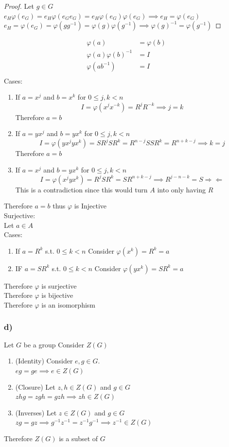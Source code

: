 \documentclass[12pt, letterpaper]{article}
\theoremstyle{definition}
\newcommand{\contr}{\Rightarrow \Leftarrow}
\begin{document}
\begin{proof}
    Let $g\in G$\\
    $e_H\varphi(e_G)=e_H\varphi(e_Ge_G)=e_H\varphi(e_G)\varphi(e_G) \implies e_H=\varphi(e_G)$\\
    $e_H=\varphi(e_G)=\varphi(gg^{-1})=\varphi(g)\varphi(g^{-1}) \implies \varphi(g)^{-1}=\varphi(g^{-1})$
\end{proof}
\begin{align*}
    \varphi(a) &= \varphi(b)\\
    \varphi(a)\varphi(b)^{-1} &= I\\
    \varphi(ab^{-1}) &= I\\
\end{align*}
Cases:
\begin{enumerate}
    \item If $a=x^j$ and $b=x^k$ for $0 \leq j,k < n$
    \[
    I=\varphi(x^jx^{-k})=R^jR^{-k} \implies j=k
    \]
    Therefore $a=b$
    \item If $a=yx^j$ and $b=yx^k$ for $0 \leq j,k < n$
    \[
    I=\varphi(yx^jyx^k)=SR^jSR^k=R^{n-j}SSR^k=R^{n+k-j} \implies k=j
    \]
    Therefore $a=b$
    \item If $a=x^j$ and $b=yx^k$ for $0 \leq j,k < n$
    \[
    I=\varphi(x^jyx^k)=R^jSR^k=SR^{n+k-j} \implies R^{j-n-k}=S \contr
    \]
    This is a contradiction since this would turn $A$ into only having $R$
\end{enumerate}
Therefore $a=b$ thus $\varphi$ is Injective\\
Surjective:\\
Let $a\in A$\\
Cases:
\begin{enumerate}
    \item If $a=R^k$ s.t. $0 \leq k < n$
    Consider $\varphi(x^k)=R^k=a$
    \item IF $a=SR^k$ s.t. $0 \leq k < n$
    Consider $\varphi(yx^k)=SR^k=a$
\end{enumerate}
Therefore $\varphi$ is surjective\\
Therefore $\varphi$ is bijective\\
Therefore $\varphi$ is an isomorphism

\newpage
\subsubsection*{d)}
Let $G$ be a group
Consider $Z(G)$
\begin{enumerate}
    \item (Identity)
    Consider $e,g \in G$.\\
    $eg=ge \implies e \in Z(G)$
    \item (Closure)
    Let $z,h \in Z(G)$ and $g \in G$\\
    $zhg=zgh=gzh \implies zh \in Z(G)$
    \item (Inverses)
    Let $z \in Z(G)$ and $g \in G$\\
    $zg=gz \implies g^{-1}z^{-1}=z^{-1}g^{-1} \implies z^{-1}\in Z(G)$
\end{enumerate}
Therefore $Z(G)$ is a subset of $G$
\end{document}
